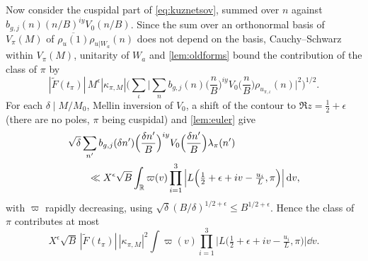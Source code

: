 \documentclass[11pt,colorlinks]{charlie}
\begin{document}
Now consider the cuspidal part of \eqref{eq:kuznetsov}, summed over $n$ against $b_{g,j}(n)(n/B)^{iy}V_0(n/B)$. Since the sum over an orthonormal basis of $V_\pi(M)$ of $\overline{\rho_u(1)}\rho_{u|W_a}(n)$ does not depend on the basis, Cauchy--Schwarz within $V_\pi(M)$, unitarity of $W_a$ and \cref{lem:oldforms} bound the contribution of the class of $\pi$ by
\[
 |\widetilde F(t_\pi)|\,M^\epsilon|\kappa_{\pi,M}|\Big(\sum_\iota\Big|\sum_nb_{g,j}(n)\Big(\frac nB\Big)^{iy}V_0\Big(\frac nB\Big)\rho_{u_{\pi,\iota}}(n)\Big|^2\Big)^{1/2}.
\]
For each $\delta\mid M/M_0$, Mellin inversion of $V_0$, a shift of the contour to $\Re z=\frac12+\epsilon$ (there are no poles, $\pi$ being cuspidal) and \cref{lem:euler} give
\[
 \begin{split}
 &\sqrt\delta\sum_{n'}b_{g,j}(\delta n')\Big(\frac{\delta n'}B\Big)^{iy}V_0\Big(\frac{\delta n'}B\Big)\lambda_\pi(n')\\
 &\qquad\ll X^\epsilon\sqrt B\int_{\mathbb{R}}\varpi(v)\prod_{i=1}^3\Big|L\Big(\tfrac12+\epsilon+iv-\tfrac{u_i}L,\pi\Big)\Big|\,\mathrm{d} v,
 \end{split}
\]
with $\varpi$ rapidly decreasing, using $\sqrt\delta(B/\delta)^{1/2+\epsilon}\le B^{1/2+\epsilon}$. Hence the class of $\pi$ contributes at most
\begin{equation}\label{eq:classbound}
 X^\epsilon\sqrt B\,|\widetilde F(t_\pi)|\,|\kappa_{\pi,M}|^2\int\varpi(v)\prod_{i=1}^3\Big|L\Big(\tfrac12+\epsilon+iv-\tfrac{u_i}L,\pi\Big)\Big|\dd v .
\end{equation}
\end{document}
